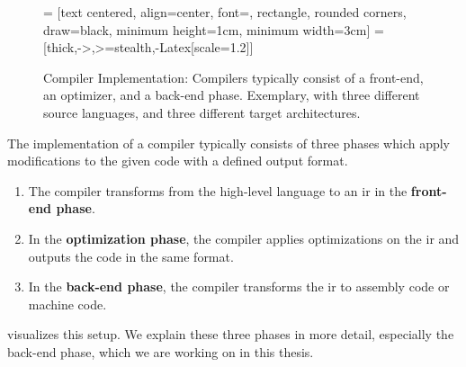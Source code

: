 \begin{figure}
    \centering
     = [text centered, align=center, font=\small\accentfont, rectangle, rounded corners, draw=black, minimum height=1cm, minimum width=3cm]
     = [thick,->,>=stealth,-{Latex[scale=1.2]}]
    \caption[Compiler Overview]{Compiler Implementation: Compilers typically consist of a front-end, an optimizer, and a back-end phase.
    Exemplary, with three different source languages, and three different target architectures.}
    \label{fig:bg:compiler-overview}
\end{figure}
The implementation of a compiler typically consists of three phases which apply modifications to the given code with a defined output format.
\begin{enumerate}
    \item The compiler transforms from the high-level language to an \ac{ir} in the \textbf{front-end phase}.
    \item In the \textbf{optimization phase}, the compiler applies optimizations on the \ac{ir} and outputs the code in the same format.
    \item In the \textbf{back-end phase}, the compiler transforms the \ac{ir} to assembly code or machine code.
\end{enumerate}
 visualizes this setup.
We explain these three phases in more detail, especially the back-end phase, which we are working on in this thesis.

